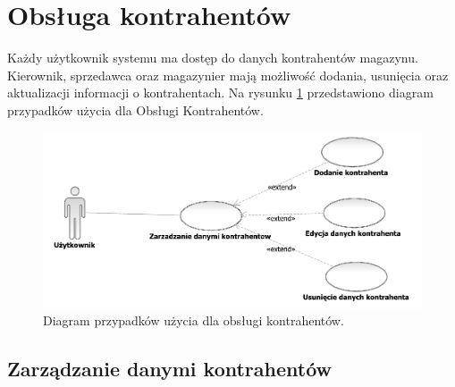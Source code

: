 \section{Obsługa kontrahentów}
Każdy użytkownik systemu ma dostęp do danych kontrahentów magazynu.
Kierownik, sprzedawca oraz magazynier mają możliwość
dodania, usunięcia oraz aktualizacji informacji o kontrahentach.
Na rysunku \ref{fig:ObslugaKontrahentow} przedstawiono diagram przypadków
użycia dla Obsługi Kontrahentów.

\begin{figure}[H]
  \centering
  \includegraphics[scale=0.6]{../img/usecase/ObslugaKontrahentow.pdf}
  \caption{Diagram przypadków użycia dla obsługi kontrahentów.}
  \label{fig:ObslugaKontrahentow}
\end{figure}

\newpage

\singlespacing
\subsection{Zarządzanie danymi kontrahentów} 
\begin{usecase}
\end{usecase}

